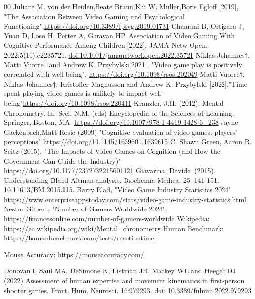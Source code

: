 \documentclass[conference]{IEEEtran}
\begin{document}
\begin{thebibliography}{00}
Juliane M. von der Heiden,Beate Braun,Kai W. Müller,Boris Egloff [2019], "The Association Between Video Gaming and Psychological Functioning",\href{https://doi.org/10.3389/fpsyg.2019.01731}{https://doi.org/10.3389/fpsyg.2019.01731}
 Chaarani B, Ortigara J, Yuan D, Loso H, Potter A, Garavan HP. Association of Video Gaming With Cognitive Performance Among Children [2022]. JAMA Netw Open. 2022;5(10):e2235721. \href{doi:10.1001/jamanetworkopen.2022.35721}{doi:10.1001/jamanetworkopen.2022.35721}
Niklas Johannes†, Matti Vuorre† and Andrew K. Przybylski[2021], "Video game play is positively correlated with well-being", \href{https://doi.org/10.1098/rsos.202049}{https://doi.org/10.1098/rsos.202049}
 Matti Vuorre†, Niklas Johannes†, Kristoffer Magnusson and Andrew K. Przybylski [2022],"Time spent playing video games is unlikely to impact well-being"\href{https://doi.org/10.1098/rsos.220411}{https://doi.org/10.1098/rsos.220411}
 Kranzler, J.H. (2012). Mental Chronometry. In: Seel, N.M. (eds) Encyclopedia of the Sciences of Learning. Springer, Boston, MA. \href{https://doi.org/10.1007/978-1-4419-1428-6_238}{https://doi.org/10.1007/978-1-4419-1428-6_238}
Jayne Gackenbach,Matt Rosie (2009) "Cognitive evaluation of video games: players' perceptions" \href{https://doi.org/10.1145/1639601.1639615}{https://doi.org/10.1145/1639601.1639615}
C. Shawn Green, Aaron R. Seitz (2015), "The Impacts of Video Games on Cognition (and How the Government Can Guide the Industry)" \href{https://doi.org/10.1177/2372732215601121}{https://doi.org/10.1177/2372732215601121}
 Giavarina, Davide. (2015). Understanding Bland Altman analysis. Biochemia Medica. 25. 141-151. 10.11613/BM.2015.015.
 Barry Elad, "Video Game Industry Statistics 2024" \href{https://www.enterpriseappstoday.com/stats/video-game-industry-statistics.html}{https://www.enterpriseappstoday.com/stats/video-game-industry-statistics.html}
Nestor Gilbert, "Number of Gamers Worldwide 2024", \href{https://financesonline.com/number-of-gamers-worldwide}{https://financesonline.com/number-of-gamers-worldwide} 
Wikipedia: \href{https://en.wikipedia.org/wiki/Mental_chronometry#Standard_reaction_time_paradigms}{https://en.wikipedia.org/wiki/Mental_chronometry}
Human Benchmark:
\href{https://humanbenchmark.com/tests/reactiontime}{https://humanbenchmark.com/tests/reactiontime}

Mouse Accuracy: \href{https://mouseaccuracy.com/}{https://mouseaccuracy.com/}

 Donovan I, Saul MA, DeSimone K, Listman JB, Mackey WE and Heeger DJ (2022) Assessment of human expertise and movement kinematics in first-person shooter games. Front. Hum. Neurosci. 16:979293. doi: 10.3389/fnhum.2022.979293


\end{thebibliography}
\end{document}
